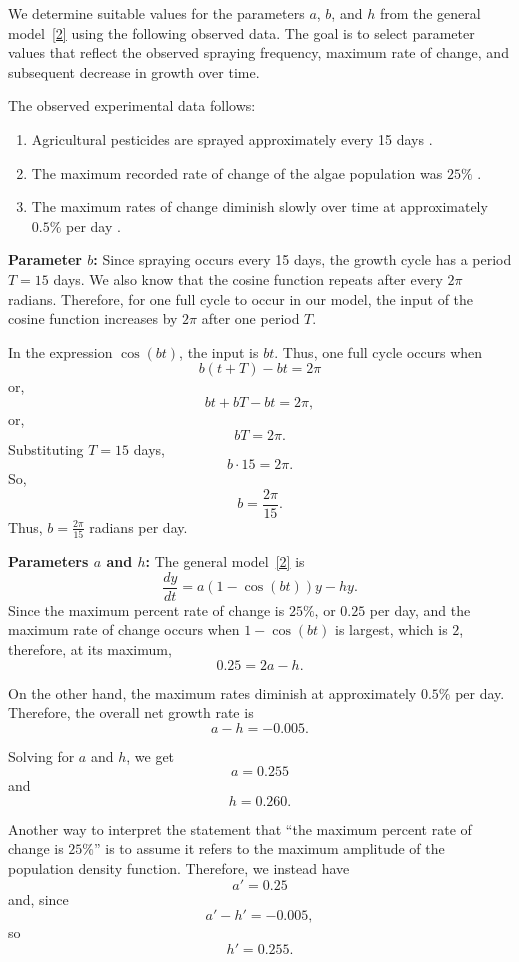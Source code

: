\documentclass[11pt]{article}
\begin{document}
We determine suitable values for the parameters $a$, $b$, and $h$ from the general model~\ref{2} using the following observed data. The goal is to select parameter values that reflect the observed spraying frequency, maximum rate of change, and subsequent decrease in growth over time.

The observed experimental data follows:
\begin{enumerate}
    \item Agricultural pesticides are sprayed approximately every 15 days \cite{harwood-algae}.
    \item The maximum recorded rate of change of the algae population was $25\%$ \cite{harwood-algae}.
    \item The maximum rates of change diminish slowly over time at approximately $0.5\%$ per day \cite{harwood-algae}.
\end{enumerate}

\textbf{Parameter $b$:} Since spraying occurs every 15 days, the growth cycle has a period $T = 15$ days. We also know that the cosine function repeats after every $2\pi$ radians. Therefore, for one full cycle to occur in our model, the input of the cosine function increases by $2\pi$ after one period $T$.

In the expression $\cos(bt)$, the input is $bt$. Thus, one full cycle occurs when
\[
b(t+T) - bt = 2\pi
\]
or,
\[
bt + bT - bt = 2\pi,
\]
or,
\[
bT = 2\pi.
\]
Substituting $T = 15$ days,
\[
b\cdot15 = 2\pi.
\]
So,
\[
b = \frac{2\pi}{15}.
\]
Thus, $b = \frac{2\pi}{15}$ radians per day.

\textbf{Parameters $a$ and $h$:} The general model~\ref{2} is
\begin{equation}
    \frac{dy}{dt} = a(1 - \cos(bt))y - hy.
\end{equation}
Since the maximum percent rate of change is $25\%$, or $0.25$ per day, and the maximum rate of change occurs when $1 - \cos(bt)$ is largest, which is $2$, therefore, at its maximum,
\[
0.25 = 2a - h.
\]

On the other hand, the maximum rates diminish at approximately $0.5\%$ per day. Therefore, the overall net growth rate is
\[
a - h = -0.005.
\]

Solving for $a$ and $h$, we get
\[
a = 0.255
\]
and
\[
h = 0.260.
\]

Another way to interpret the statement that ``the maximum percent rate of change is $25\%$'' is to assume it refers to the maximum amplitude of the population density function. Therefore, we instead have
\[
a' = 0.25
\]
and, since
\[
a' - h' = -0.005,
\]
so
\[
h' = 0.255.
\]
\end{document}
